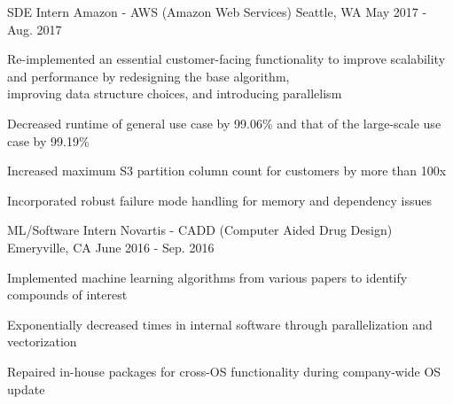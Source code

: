 

\begin{cventries}

  \cventry
    {SDE Intern} %
    {Amazon - AWS (Amazon Web Services)} %
    {Seattle, WA} %
    {May 2017 - Aug. 2017} %
    {
      \begin{cvitems} %
        \item {Re-implemented an essential customer-facing functionality to improve scalability and performance by redesigning the base algorithm,\\
        improving data structure choices, and introducing parallelism}
        \item {Decreased runtime of general use case by 99.06\% and that of the large-scale use case by 99.19\%}
        \item {Increased maximum S3 partition column count for customers by more than 100x}
        \item {Incorporated robust failure mode handling for memory and dependency issues}
      \end{cvitems}
    }

  \cventry
    {ML/Software Intern} %
    {Novartis - CADD (Computer Aided Drug Design)} %
    {Emeryville, CA} %
    {June 2016 - Sep. 2016} %
    {
      \begin{cvitems} %
        \item {Implemented machine learning algorithms from various papers to identify compounds of interest}
        \item {Exponentially decreased times in internal software through parallelization and vectorization}
        \item {Repaired in-house packages for cross-OS functionality during company-wide OS update}
      \end{cvitems}
    }
\end{cventries}
